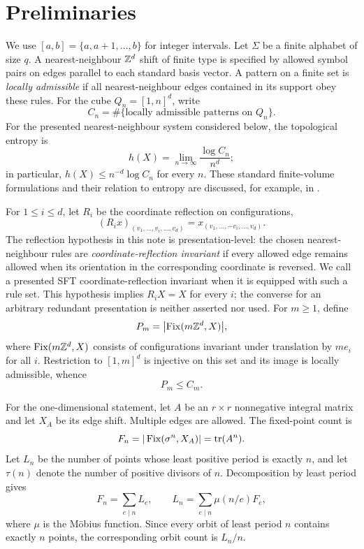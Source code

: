 \section{Preliminaries}
\label{sec:preliminaries}

We use $[a,b]=\{a,a+1,\ldots,b\}$ for integer intervals.  Let $\Sigma$ be a
finite alphabet of size $q$.  A nearest-neighbour $\mathbb Z^d$ shift of finite
type is specified by allowed symbol pairs on edges parallel to each standard
basis vector.  A pattern on a finite set is \emph{locally admissible} if all
nearest-neighbour edges contained in its support obey these rules.  For the
cube $Q_n=[1,n]^d$, write
\[
  C_n=\#\{\text{locally admissible patterns on }Q_n\}.
\]
For the presented nearest-neighbour system considered below, the topological
entropy is
\[
  h(X)=\lim_{n\to\infty}\frac{\log C_n}{n^d};
\]
in particular, $h(X)\le n^{-d}\log C_n$ for every $n$.  These standard
finite-volume formulations and their relation to entropy are discussed, for
example, in \cite{Friedland1997,LindMarcus2021}.

For $1\le i\le d$, let $R_i$ be the coordinate reflection on configurations,
\[
  (R_i x)_{(v_1,\ldots,v_i,\ldots,v_d)}
  =x_{(v_1,\ldots,-v_i,\ldots,v_d)}.
\]
The reflection hypothesis in this note is presentation-level: the chosen
nearest-neighbour rules are \emph{coordinate-reflection invariant} if every
allowed edge remains allowed when its orientation in the corresponding
coordinate is reversed.  We call a presented SFT coordinate-reflection
invariant when it is equipped with such a rule set.  This hypothesis implies
$R_iX=X$ for every $i$; the converse for an arbitrary redundant presentation
is neither asserted nor used.
For $m\ge1$, define
\[
 P_m=\bigl|\operatorname{Fix}(m\mathbb Z^d,X)\bigr|,
\]
where $\operatorname{Fix}(m\mathbb Z^d,X)$ consists of configurations invariant under translation
by $me_i$ for all $i$.  Restriction to $[1,m]^d$ is injective on this set and
its image is locally admissible, whence
\begin{equation}
 P_m\le C_m.
 \label{eq:periodic-upper-basic}
\end{equation}

For the one-dimensional statement, let $A$ be an $r\times r$ nonnegative
integral matrix and let $X_A$ be its edge shift.  Multiple edges are allowed.
The fixed-point count is
\begin{equation}
 F_n=|\operatorname{Fix}(\sigma^n,X_A)|=\operatorname{tr}(A^n).
 \label{eq:trace-fixed}
\end{equation}
Let $L_n$ be the number of points whose least positive period is exactly
$n$, and let $\tau(n)$ denote the number of positive divisors of $n$.
Decomposition by least period gives
\begin{equation}
 F_n=\sum_{e\mid n}L_e,
 \qquad
 L_n=\sum_{e\mid n}\mu(n/e)F_e,
 \label{eq:mobius}
\end{equation}
where $\mu$ is the M\"obius function.  Since every orbit of least period $n$
contains exactly $n$ points, the corresponding orbit count is $L_n/n$.
